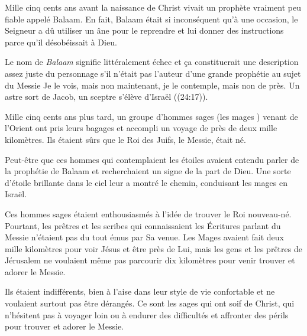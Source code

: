 

Mille cinq cents ans avant la naissance de Christ vivait un prophète vraiment peu fiable appelé Balaam. En fait, Balaam était si inconséquent qu'à une occasion, le Seigneur a dû utiliser un âne pour le reprendre et lui donner des instructions parce qu'il désobéissait à Dieu.

Le nom de \emph{Balaam} signifie littéralement \Og échec \Fg{} et ça constituerait une description assez juste du personnage s'il n'\'etait pas l'auteur d'une grande prophétie au sujet du Messie\frcolon{} \Og Je le vois, mais non maintenant, je le contemple, mais non de près. Un astre sort de Jacob, un sceptre s’élève d’Israël \Fg{} ((24:17)).

Mille cinq cents ans plus tard, un groupe d'hommes sages (\Og les mages \Fg{}) venant de l'Orient ont pris leurs bagages et accompli un voyage de près de deux mille kilomètres. Ils étaient sûrs que le Roi des Juifs, le Messie, était né.

Peut-être que ces hommes qui contemplaient les étoiles avaient entendu parler de la prophétie de Balaam et recherchaient un signe de la part de Dieu. Une sorte d'étoile brillante dans le ciel leur a montré le chemin, conduisant les mages en Israël.

Ces hommes sages étaient enthousiasmés à l'idée de trouver le Roi nouveau-né. Pourtant, les prêtres et les scribes qui connaissaient les Écritures parlant du Messie n'étaient pas du tout émus par Sa venue. Les Mages avaient fait deux mille kilomètres pour voir Jésus et être près de Lui, mais les gens et les prêtres de Jérusalem ne voulaient même pas parcourir dix kilomètres pour venir trouver et adorer le Messie.

Ils étaient indifférents, bien à l'aise dans leur style de vie confortable et ne voulaient surtout pas être dérangés. Ce sont les sages qui ont soif de Christ, qui n'hésitent pas à voyager loin ou à endurer des difficultés et affronter des périls pour trouver et adorer le Messie.

